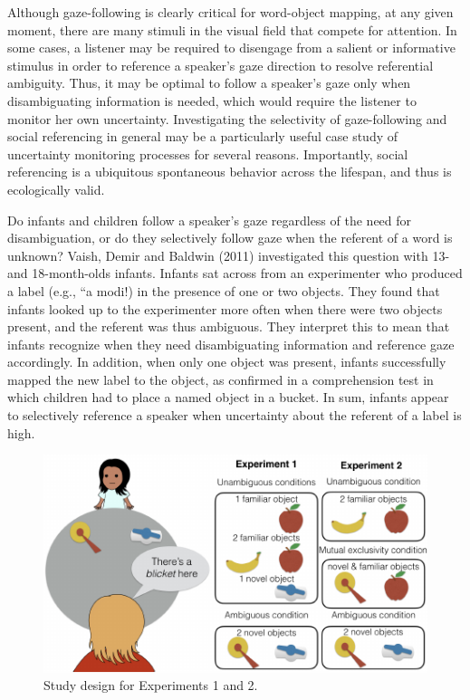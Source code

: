 \documentclass[10pt, letterpaper]{article}
\newenvironment{CodeChunk}{}{}
\begin{document}
Although gaze-following is clearly critical for word-object mapping, at
any given moment, there are many stimuli in the visual field that
compete for attention. In some cases, a listener may be required to
disengage from a salient or informative stimulus in order to reference a
speaker's gaze direction to resolve referential ambiguity. Thus, it may
be optimal to follow a speaker's gaze only when disambiguating
information is needed, which would require the listener to monitor her
own uncertainty. Investigating the selectivity of gaze-following and
social referencing in general may be a particularly useful case study of
uncertainty monitoring processes for several reasons. Importantly,
social referencing is a ubiquitous spontaneous behavior across the
lifespan, and thus is ecologically valid.

Do infants and children follow a speaker's gaze regardless of the need
for disambiguation, or do they selectively follow gaze when the referent
of a word is unknown? Vaish, Demir and Baldwin (2011) investigated this
question with 13- and 18-month-olds infants. Infants sat across from an
experimenter who produced a label (e.g., ``a modi!) in the presence of
one or two objects. They found that infants looked up to the
experimenter more often when there were two objects present, and the
referent was thus ambiguous. They interpret this to mean that infants
recognize when they need disambiguating information and reference gaze
accordingly. In addition, when only one object was present, infants
successfully mapped the new label to the object, as confirmed in a
comprehension test in which children had to place a named object in a
bucket. In sum, infants appear to selectively reference a speaker when
uncertainty about the referent of a label is high.

\begin{CodeChunk}
\captionsetup{width=0.8\columnwidth}\begin{figure}[h]

{\centering \includegraphics{figs/design-1} 

}

\caption[Study design for Experiments 1 and 2]{Study design for Experiments 1 and 2.}\label{fig:design}
\end{figure}
\end{CodeChunk}
\end{document}
